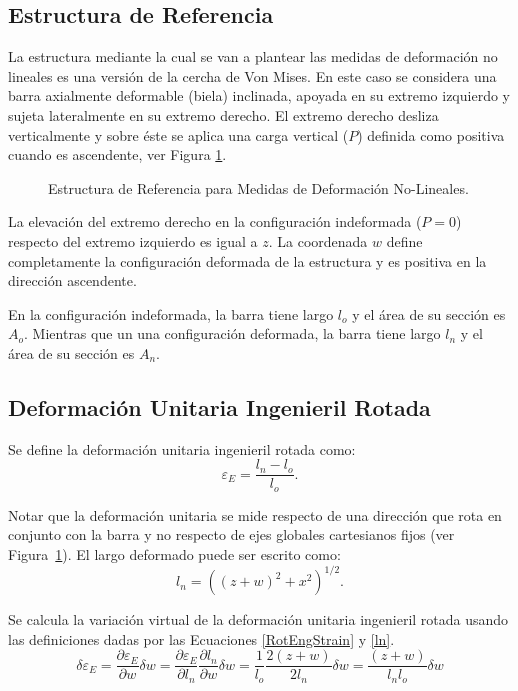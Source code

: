 \subsection{Estructura de Referencia} \label{sec:cerchamises}

La estructura mediante la cual se van a plantear las medidas de deformación no lineales es una versión de la cercha de Von Mises. En este caso se considera una barra axialmente deformable (biela) inclinada, apoyada en su extremo izquierdo y sujeta lateralmente en su extremo derecho. El extremo derecho desliza verticalmente y sobre éste se aplica una carga vertical ($P$) definida como positiva cuando es ascendente, ver Figura \ref{fig:nonlinstrainm}.

\begin{figure}[htb]
	\centering
	\def\svgwidth{0.6\textwidth}

	\caption{Estructura de Referencia para Medidas de Deformación No-Lineales.}
	\label{fig:nonlinstrainm}
\end{figure}

La elevación del extremo derecho en la configuración indeformada ($P=0$) respecto del extremo izquierdo es igual a $z$. La coordenada $w$ define completamente la configuración deformada de la estructura y es positiva en la dirección ascendente.

En la configuración indeformada, la barra tiene largo $l_o$ y el área de su sección es $A_o$. Mientras que un una configuración deformada, la barra tiene largo $l_n$ y el área de su sección es $A_n$.

\subsection{Deformación Unitaria Ingenieril Rotada}

Se define la deformación unitaria ingenieril rotada como:
%
\begin{equation}\label{RotEngStrain}
\varepsilon_E = \frac{l_n-l_o}{l_o}.
\end{equation}

Notar que la deformación unitaria se mide respecto de una dirección que rota en conjunto con la barra y no respecto de ejes globales cartesianos fijos (ver Figura~\ref{fig:nonlinstrainm}). El largo deformado puede ser escrito como:
%
\begin{equation}\label{ln}
l_n = \left((z+w)^2+x^2\right)^{1/2}.
\end{equation}

Se calcula la variación virtual de la deformación unitaria ingenieril rotada usando las definiciones dadas por las Ecuaciones \eqref{RotEngStrain} y \eqref{ln}.
%
\begin{equation}\label{VirtEngStrain}
\delta \varepsilon_E = \frac{\partial \varepsilon_E}{\partial w} \delta w = \frac{\partial \varepsilon_E}{\partial l_n}\frac{\partial l_n}{\partial w}\delta w =	\frac{1}{l_o}\frac{2(z+w)}{2l_n}\delta w = \frac{(z+w)}{l_n l_o}\delta w
\end{equation}

